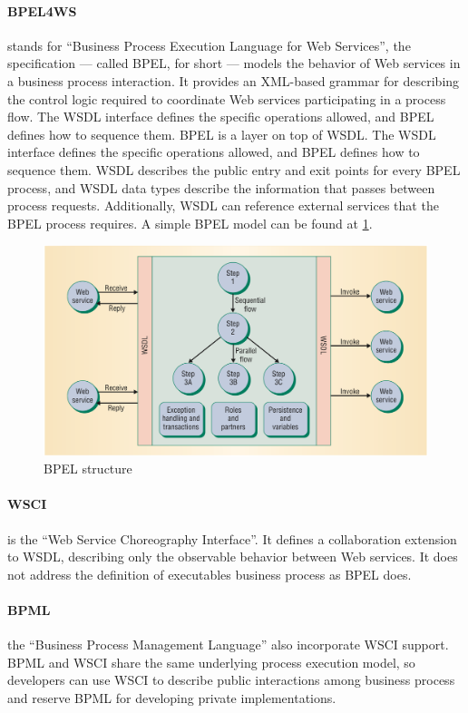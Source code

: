 \paragraph{BPEL4WS} 
stands for ``Business Process Execution Language for Web Services'', the specification — called BPEL, for short — models the behavior of Web services in a business process interaction. It provides an XML-based grammar for describing the control logic required to coordinate Web services participating in a process flow. The WSDL interface defines the specific operations allowed, and BPEL defines how to sequence them. BPEL is a layer on top of WSDL. The WSDL interface defines the specific operations allowed, and BPEL defines how to sequence them. WSDL describes the public entry and exit points for every BPEL process, and WSDL data types describe the information that passes between process requests. Additionally, WSDL can reference external services that the BPEL process requires. A simple BPEL model can be found at \ref{BPELstructure}.

\begin{figure}[htb]
  \centering
  \includegraphics[width=\textwidth]{images/BPELstructure}
  \caption{BPEL structure}
  \label{BPELstructure}
\end{figure}

\paragraph{WSCI}
is the ``Web Service Choreography Interface''. It defines a collaboration extension to WSDL, describing only the observable behavior between Web services. It does not address the definition of executables business process as BPEL does.

\paragraph{BPML} 
the ``Business Process Management Language'' also incorporate WSCI support. BPML and WSCI share the same underlying process execution model, so developers can use WSCI to describe public interactions among business process and reserve BPML for developing private implementations.

